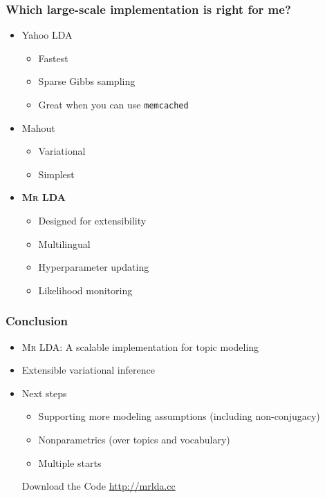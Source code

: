 \begin{frame}
	\frametitle{Which large-scale implementation is right for me?}
	
	\begin{itemize}
		\item Yahoo LDA~\cite{smola-10}
			\begin{itemize}
				\item Fastest
				\item Sparse Gibbs sampling 
				\item Great when you can use \texttt{memcached}
			\end{itemize}
		\item Mahout
			\begin{itemize}
				\item Variational
				\item Simplest
			\end{itemize}			
		\item {\bf \textsc{Mr LDA}}
		\begin{itemize}
			\item Designed for extensibility
			\item Multilingual
			\item Hyperparameter updating~\cite{wallach-09b}
			\item Likelihood monitoring
		\end{itemize}
	\end{itemize}


\end{frame}

\begin{frame}

	\frametitle{Conclusion}

	\begin{itemize}
		\item \textsc{Mr LDA}: A scalable implementation for topic modeling
		\item Extensible variational inference
		\item Next steps
		\begin{itemize}
			\item Supporting more modeling assumptions (including non-conjugacy)
			\item Nonparametrics (over topics and vocabulary)
			\item Multiple starts
		\end{itemize}

	\begin{block}{Download the Code}
		\url{http://mrlda.cc}
	\end{block}

	\end{itemize}

\end{frame}
